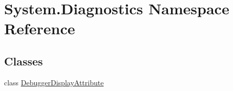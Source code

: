 \hypertarget{namespaceSystem_1_1Diagnostics}{}\section{System.\+Diagnostics Namespace Reference}
\label{namespaceSystem_1_1Diagnostics}
\subsection*{Classes}
\begin{DoxyCompactItemize}
\item 
class \hyperlink{classSystem_1_1Diagnostics_1_1DebuggerDisplayAttribute}{Debugger\+Display\+Attribute}
\end{DoxyCompactItemize}
